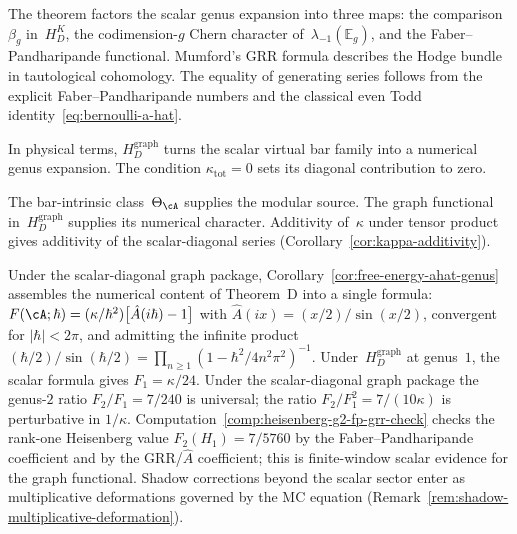 \begin{remark}\label{rem:family-index-punchline}
The theorem factors the scalar genus expansion into three maps:
the comparison~$\beta_g$ in~$H_D^K$, the codimension-$g$ Chern
character of~$\lambda_{-1}(\mathbb E_g)$, and the
Faber--Pandharipande functional.  Mumford's GRR formula describes the
Hodge bundle in tautological cohomology.  The equality of generating
series follows from the explicit Faber--Pandharipande numbers and the
classical even Todd identity~\eqref{eq:bernoulli-a-hat}.

In physical terms, $H_D^{\mathrm{graph}}$ turns the scalar virtual
bar family into a numerical genus expansion.  The condition
$\kappa_{\mathrm{tot}}=0$ sets its diagonal contribution to zero.

The bar-intrinsic class~$\Theta_\cA$ supplies the modular source.
The graph functional in~$H_D^{\mathrm{graph}}$ supplies its numerical
character.  Additivity of~$\kappa$ under tensor product gives
additivity of the scalar-diagonal series
(Corollary~\ref{cor:kappa-additivity}).
\end{remark}

\begin{remark}
\label{rem:concordance-scalar-free-energy}
Under the scalar-diagonal graph package,
Corollary~\ref{cor:free-energy-ahat-genus} assembles
the numerical content of Theorem~D into a single formula:
$F(\cA;\hbar) = (\kappa/\hbar^2)\bigl[\hat{A}(i\hbar)-1\bigr]$
with $\hat{A}(ix) = (x/2)/\sin(x/2)$, convergent for
$|\hbar|<2\pi$, and admitting the infinite product
$(\hbar/2)/\sin(\hbar/2) = \prod_{n \geq 1}
(1 - \hbar^2/4n^2\pi^2)^{-1}$.
Under~$H_D^{\mathrm{graph}}$ at genus~$1$, the scalar formula gives
$F_1=\kappa/24$. Under the scalar-diagonal graph package the genus-$2$ ratio
$F_2/F_1 = 7/240$ is universal;
the ratio $F_2/F_1^2 = 7/(10\kappa)$ is perturbative
in $1/\kappa$. Computation~\ref{comp:heisenberg-g2-fp-grr-check}
checks the rank-one Heisenberg value $F_2(H_1)=7/5760$ by the
Faber--Pandharipande coefficient and by the GRR/$\hat A$ coefficient;
this is finite-window scalar evidence for the graph functional.
Shadow corrections beyond the scalar sector enter as multiplicative
deformations governed by the MC equation
(Remark~\ref{rem:shadow-multiplicative-deformation}).
\end{remark}

